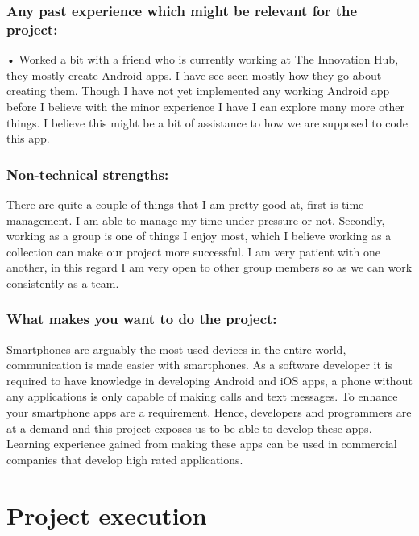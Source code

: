 \documentclass[12pt]{article}
\begin{document}
\begin{description}
	 \subsubsection{Any past experience which might be relevant for the project:}
	 
	 • Worked a bit with a friend who is currently working at The Innovation Hub, they mostly create Android apps. I have see seen mostly how they go about creating them. Though I have not yet implemented any working Android app before I believe with the minor experience I have I can explore many more other things. I believe this might be a bit of assistance to how we are supposed to code this app.
	 
	 \subsubsection{Non-technical strengths:}
	 
	 There are quite a couple of things that I am pretty good at, first is time management. I am able to manage my time under pressure or not. Secondly, working as a group is one of things I enjoy most, which I believe working as a collection can make our project more successful. I am very patient with one another, in this regard I am very open to other group members so as we can work consistently as a team.
	 
	 \subsubsection{What makes you want to do the project:}
	
	Smartphones are arguably the most used devices in the entire world, communication is made easier with smartphones. As a software developer it is required to have knowledge in developing Android and iOS apps, a phone without any applications is only capable of making calls and text messages. To enhance your smartphone apps are a requirement. Hence, developers and programmers are at a demand and this project exposes us to be able to develop these apps. Learning experience gained from making these apps can be used in commercial companies that develop high rated applications. 
	
	
	\end{description}
	



\section{Project execution}
\end{document}
